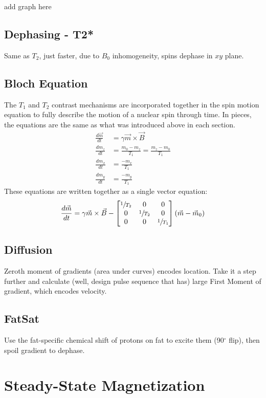 add graph here

\subsection{Dephasing - T2*}
Same as $T_2$, just faster, due to $B_0$ inhomogeneity, spins dephase in $xy$ plane.
\subsection{Bloch Equation}
The $T_1$ and $T_2$ contrast mechanisms are incorporated together in the spin motion equation to fully describe the motion of a nuclear spin through time. In pieces, the equations are the same as what was introduced above in each section.
\begin{align}
\frac{d\vec{m}}{dt} &= \gamma \vec{m} \times \vec{B}  \\
\frac{dm_z}{dt}&= \frac{m_0-m_z}{T_1} =\frac{m_z-m_0}{T_1} \\
\frac{dm_{x}}{dt}&= \frac{-m_{x}}{T_1}  \\
\frac{dm_{y}}{dt}&= \frac{-m_{y}}{T_1}
\end{align}
These equations are written together as a single vector equation:
\begin{equation}
\frac{d\vec{m}}{dt} = \gamma \vec{m} \times \vec{B} -\left[\begin{matrix}\sfrac{1}{T_2}&0&0\\0&\sfrac{1}{T_2}&0\\0&0&\sfrac{1}{T_1}\end{matrix}\right] \left(\vec{m}-\vec{m}_0\right)
\end{equation}
\subsection{Diffusion}
Zeroth moment of gradients (area under curves) encodes location. Take it a step further and calculate (well, design pulse sequence that has) large First Moment of gradient, which encodes velocity. 
\subsection{FatSat}
Use the fat-specific chemical shift of protons on fat to excite them (90$^\circ$ flip), then spoil gradient to dephase.
\section{Steady-State Magnetization}

